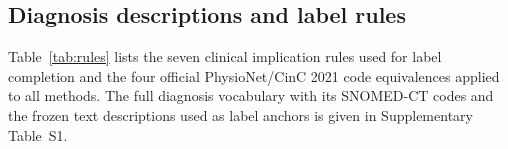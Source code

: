 \documentclass[pdflatex,sn-mathphys-num]{sn-jnl}
\theoremstyle{thmstyleone}%
\theoremstyle{thmstyletwo}%
\begin{document}
\begin{appendices}
\section{Diagnosis descriptions and label rules}\label{secA1}
Table~\ref{tab:rules} lists the seven clinical implication rules used for label completion and the four official PhysioNet/CinC 2021 code equivalences applied to all methods. The full diagnosis vocabulary with its SNOMED-CT codes and the frozen text descriptions used as label anchors is given in Supplementary Table~S1.
\begingroup\let\table\tableorg\let\endtable\endtableorg

\endgroup

\end{appendices}


\end{document}
